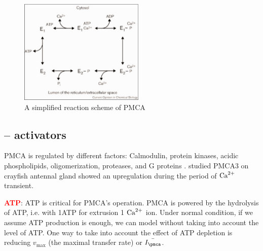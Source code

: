 \begin{figure}[hbt]
  \centerline{\includegraphics[height=5cm,
    angle=0]{./images/pmca_E1E2.eps}}
\caption{A simplified reaction scheme of PMCA \citep{carafoli2000}}
\label{fig:pmca_E1E2}
\end{figure}

% 
%    
% 
% 
% 
%   
% 

\subsection{-- activators}
\label{sec:PMCA-activator}

PMCA is regulated by different factors: Calmodulin, protein kinases, acidic
phospholipids, oligomerization, proteases, and G proteins \citep{monteith1995}.
\citep{gao2004} studied PMCA3 on crayfish antennal gland showed an upregulation
during the period of ${\text{Ca}^{2+}}$ transient. 


\textcolor{red}{\bf ATP}: ATP is critical for PMCA's operation.
PMCA is powered by the hydrolysis of ATP, i.e. with 1ATP for extrusion 1 ${\text{Ca}^{2+}}$
ion. Under normal condition, if we assume ATP production is enough, we can model
without taking into account the level of ATP. One way to take into account the
effect of ATP depletion is reducing $v_\max$ (the maximal transfer rate) or
$\bar{I_\pmca}$.

